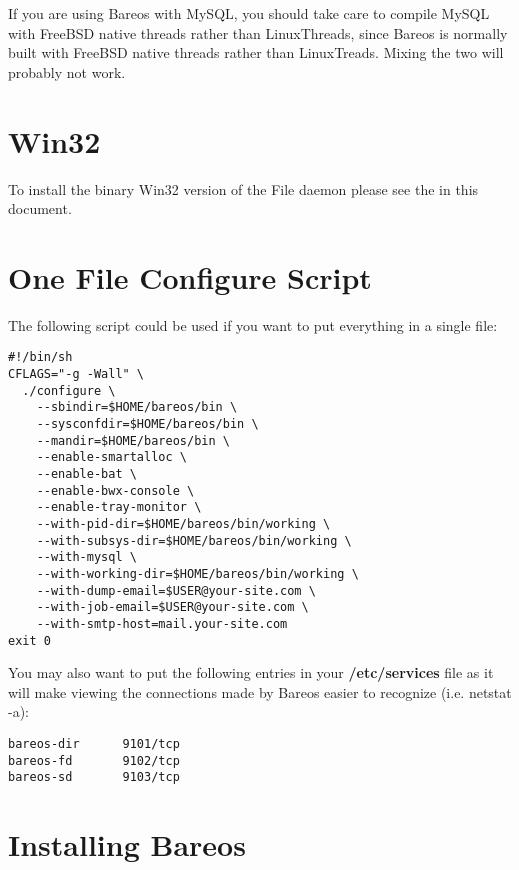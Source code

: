 If you are using Bareos with MySQL, you should take care to compile MySQL with
FreeBSD native threads rather than LinuxThreads, since Bareos is normally built
with FreeBSD native threads rather than LinuxTreads. Mixing the two will
probably not work.

\section{Win32}

To install the binary Win32 version of the File daemon please see the
 in this document.

\section{One File Configure Script}

The following script could be used if you want to put everything
in a single file:

\footnotesize
\begin{verbatim}
#!/bin/sh
CFLAGS="-g -Wall" \
  ./configure \
    --sbindir=$HOME/bareos/bin \
    --sysconfdir=$HOME/bareos/bin \
    --mandir=$HOME/bareos/bin \
    --enable-smartalloc \
    --enable-bat \
    --enable-bwx-console \
    --enable-tray-monitor \
    --with-pid-dir=$HOME/bareos/bin/working \
    --with-subsys-dir=$HOME/bareos/bin/working \
    --with-mysql \
    --with-working-dir=$HOME/bareos/bin/working \
    --with-dump-email=$USER@your-site.com \
    --with-job-email=$USER@your-site.com \
    --with-smtp-host=mail.your-site.com
exit 0
\end{verbatim}
\normalsize

You may also want to put the following entries in your {\bf /etc/services}
file as it will make viewing the connections made by Bareos easier to
recognize (i.e. netstat -a):

\footnotesize
\begin{verbatim}
bareos-dir      9101/tcp
bareos-fd       9102/tcp
bareos-sd       9103/tcp
\end{verbatim}
\normalsize

\section{Installing Bareos}

